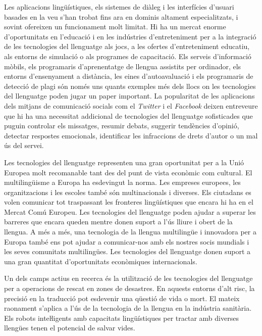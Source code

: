\begin{multicols}{2}
Les aplicacions lingüístiques, els sistemes de diàleg i les interfícies d’usuari basades en la veu s’han trobat fins ara en dominis altament especialitzats, i sovint ofereixen un funcionament molt limitat. Hi ha un mercat enorme d’oportunitats en l’educació i en les indústries d’entre\-te\-ni\-ment per a la integració de les tecnologies del llenguatge als jocs, a les ofertes d'entre\-te\-ni\-ment educatiu, als entorns de simulació o als programes de capacitació. Els serveis d’informació mòbils, els programaris d’aprenentatge de llengua assistits per ordinador, els entorns d’ensenyament a distància, les eines d’autoavaluació i els programaris de detecció de plagi són només uns quants exemples més dels llocs on les tecnologies del llenguatge poden jugar un paper important. La popularitat de les aplicacions dels mitjans de comunicació socials com el \textit{Twitter} i el \textit{Facebook} deixen entreveure que hi ha una necessitat addicional de tecnologies del llenguatge sofisticades que puguin controlar els missatges, resumir debats, suggerir tendències d’opinió, detectar respostes emocionals, identificar les infraccions de drets d’autor o un mal ús del servei. 

Les tecnologies del llenguatge representen una gran oportunitat per a la Unió Europea molt recomanable tant des del punt de vista econòmic com cultural.  El multilingüisme a Europa ha esdevingut la norma.  Les empreses europees, les organitzacions i les escoles també són multinacionals i diverses. Els ciutadans es volen comunicar tot traspassant les fronteres lingüístiques que encara hi ha en el Mercat Comú Europeu. Les tecnologies del llenguatge poden ajudar a superar les barreres que encara queden mentre donen suport a l’ús lliure i obert de la llengua. A més a més, una tecnologia de la llengua multilingüe i innovadora per a Europa també ens pot ajudar a comunicar-nos amb els nostres socis mundials i les seves comunitats multilingües. Les tecnologies del llenguatge donen suport a una gran quantitat d’oportunitats econòmiques internacionals.

Un dels camps actius en recerca és la utilització de les tecnologies del llenguatge per a operacions de rescat en zones de desastres. En aquests entorns d’alt risc, la precisió en la traducció pot esdevenir una qüestió de vida o mort. El mateix raonament s’aplica a l’ús de la tecnologia de la llengua en la indústria sanitària. Els robots inteŀligents amb capacitats lingüístiques per tractar amb diverses llengües tenen el potencial de salvar vides. 


\end{multicols}
